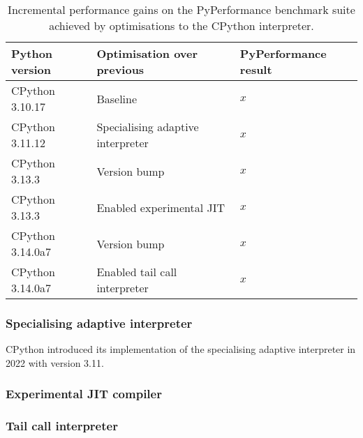 
\begin{table}[H]
  \caption{Incremental performance gains on the PyPerformance benchmark suite achieved by optimisations to the CPython interpreter.}
  \label{tab:faster-cpython}
  \centering
  \begin{tabular}{lll}
    \toprule
    \textbf{Python version} & \textbf{Optimisation over previous} & \textbf{PyPerformance result} \\
    \midrule
    CPython 3.10.17 & Baseline & $x$ \\
    CPython 3.11.12 & Specialising adaptive interpreter & $x$ \\
    CPython 3.13.3 & Version bump & $x$ \\
    CPython 3.13.3 & Enabled experimental JIT & $x$ \\
    CPython 3.14.0a7 & Version bump & $x$ \\
    CPython 3.14.0a7 & Enabled tail call interpreter & $x$ \\
    \bottomrule
  \end{tabular}
\end{table}

\subsubsection{Specialising adaptive interpreter}
\label{sssec:specialising-adaptive-interpreter}



CPython introduced its implementation of the specialising adaptive interpreter in 2022 with version 3.11.


\subsubsection{Experimental JIT compiler}
\label{sssec:experimental-jit-compiler}




\subsubsection{Tail call interpreter}
\label{sssec:tail-call-interpreter}










